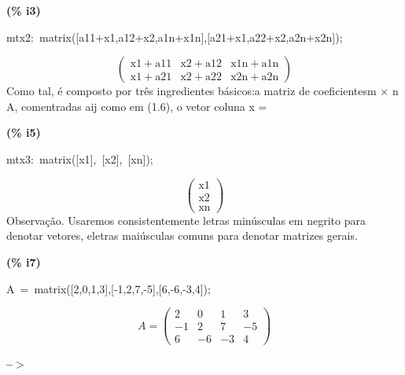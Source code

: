 \documentclass[fleqn]{article}
\begin{document}
\noindent
\begin{minipage}[t]{4.000000em}\color{red}\bfseries
(\% i3)	
\end{minipage}
\begin{minipage}[t]{\textwidth}\color{blue}
mtx2:\ matrix([a11+x1,a12+x2,a1n+x1n],[a21+x1,a22+x2,a2n+x2n]);
\end{minipage}
\[\displaystyle \tag{mtx2} 
\begin{pmatrix}\ensuremath{\mathrm{x1}}\mathop{+}\ensuremath{\mathrm{a11}} & \ensuremath{\mathrm{x2}}\mathop{+}\ensuremath{\mathrm{a12}} & \ensuremath{\mathrm{x1n}}\mathop{+}\ensuremath{\mathrm{a1n}}\\
\ensuremath{\mathrm{x1}}\mathop{+}\ensuremath{\mathrm{a21}} & \ensuremath{\mathrm{x2}}\mathop{+}\ensuremath{\mathrm{a22}} & \ensuremath{\mathrm{x2n}}\mathop{+}\ensuremath{\mathrm{a2n}}\end{pmatrix}\mbox{}
\]
Como tal, é composto por três ingredientes básicos:a matriz de coeficientesm × n A, comentradas aij como em (1.6), o vetor coluna x =


\noindent
\begin{minipage}[t]{4.000000em}\color{red}\bfseries
(\% i5)	
\end{minipage}
\begin{minipage}[t]{\textwidth}\color{blue}
mtx3:\ matrix([x1],\ [x2],\ [xn]);
\end{minipage}
\[\displaystyle \tag{mtx3} 
\begin{pmatrix}\ensuremath{\mathrm{x1}}\\
\ensuremath{\mathrm{x2}}\\
\ensuremath{\mathrm{xn}}\end{pmatrix}\mbox{}
\]
Observação. Usaremos consistentemente letras minúsculas em negrito para denotar vetores, eletras maiúsculas comuns para denotar matrizes gerais.


\noindent
\begin{minipage}[t]{4.000000em}\color{red}\bfseries
(\% i7)	
\end{minipage}
\begin{minipage}[t]{\textwidth}\color{blue}
A\ =\ matrix([2,0,1,3],[-1,2,7,-5],[6,-6,-3,4]);
\end{minipage}
\[\displaystyle \tag{\% o7} 
A\mathop{=}\begin{pmatrix}2 & 0 & 1 & 3\\
\mathop{-}1 & 2 & 7 & \mathop{-}5\\
6 & \mathop{-}6 & \mathop{-}3 & 4\end{pmatrix}\mbox{}
\]


\noindent
\begin{minipage}[t]{4.000000em}\color{red}\bfseries
 --\ensuremath{\ensuremath{>}}	
\end{minipage}
\begin{minipage}[t]{\textwidth}\color{blue}

\end{minipage}

\noindent%
\end{document}
